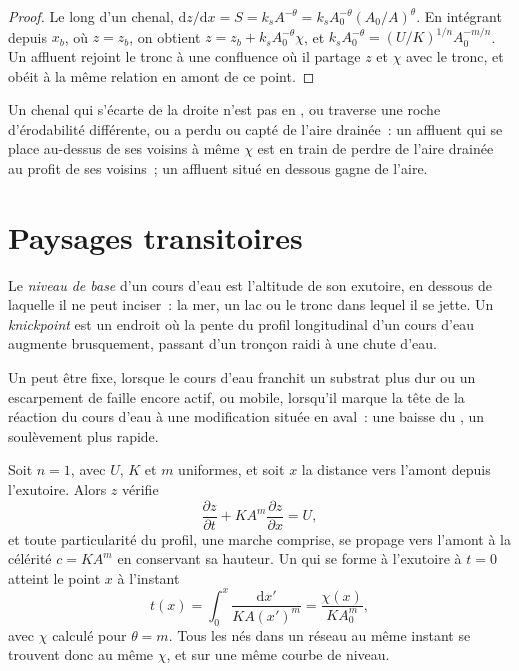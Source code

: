 \begin{proof}
Le long d'un chenal, $\mathrm{d}z/\mathrm{d}x = S = k_s A^{-\theta} = k_s
A_0^{-\theta}(A_0/A)^{\theta}$. En intégrant depuis $x_b$, où $z = z_b$,
on obtient $z = z_b + k_s A_0^{-\theta}\chi$, et $k_s A_0^{-\theta} =
(U/K)^{1/n} A_0^{-m/n}$. Un affluent rejoint le tronc à une confluence
où il partage $z$ et $\chi$ avec le tronc, et obéit à la même relation en amont de ce point.
\end{proof}

Un chenal qui s'écarte de la droite n'est pas en , ou traverse
une roche d'érodabilité différente, ou a perdu ou capté de l'aire drainée~: un
affluent qui se place au-dessus de ses voisins à même $\chi$ est en train
de perdre de l'aire drainée au profit de ses voisins~; un affluent situé en dessous gagne de l'aire.

\section{Paysages transitoires}\label{sec:b3:quantitative-geomorphology:transient}

\begin{definition}\label{def:b3:quantitative-geomorphology:knickpoint}
Le \emph{niveau de base} d'un cours d'eau est l'altitude de son
exutoire, en dessous de laquelle il ne peut inciser~: la mer, un lac ou le tronc
dans lequel il se jette. Un \emph{knickpoint} est un endroit où la pente
du profil longitudinal d'un cours d'eau augmente brusquement, passant d'un tronçon
raidi à une chute d'eau.
\end{definition}

Un  peut être fixe, lorsque le cours d'eau franchit un substrat plus dur ou un
escarpement de faille encore actif, ou mobile, lorsqu'il marque la tête de la
réaction du cours d'eau à une modification située en aval~: une baisse du , un
soulèvement plus rapide.

\begin{theorem}\label{thm:b3:quantitative-geomorphology:kinematic}
Soit $n = 1$, avec $U$, $K$ et $m$ uniformes, et soit $x$ la distance
vers l'amont depuis l'exutoire. Alors $z$ vérifie
\[
\frac{\partial z}{\partial t} + K A^m \frac{\partial z}{\partial x} = U ,
\]
et toute particularité du profil, une marche comprise, se propage vers l'amont à la
célérité $c = K A^m$ en conservant sa hauteur. Un  qui se forme
à l'exutoire à $t = 0$ atteint le point $x$ à l'instant
\[
t(x) = \int_0^x \frac{\mathrm{d}x'}{K A(x')^m} = \frac{\chi(x)}{K A_0^m},
\]
avec $\chi$ calculé pour $\theta = m$. Tous les  nés dans un réseau
au même instant se trouvent donc au même $\chi$, et sur une même courbe de niveau.
\end{theorem}

